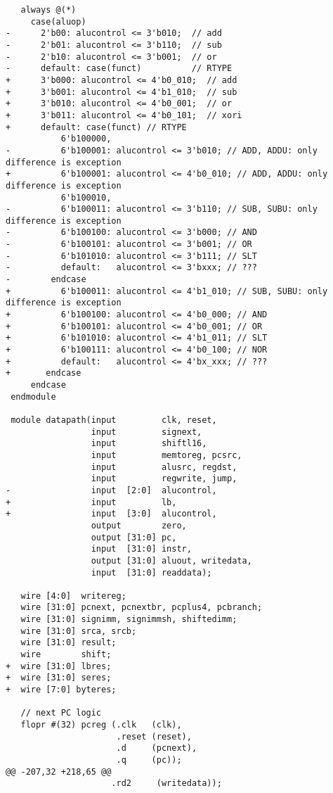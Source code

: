 \begin{verbatim}
   always @(*)
     case(aluop)
-      2'b00: alucontrol <= 3'b010;  // add
-      2'b01: alucontrol <= 3'b110;  // sub
-      2'b10: alucontrol <= 3'b001;  // or
-      default: case(funct)          // RTYPE
+      3'b000: alucontrol <= 4'b0_010;  // add
+      3'b001: alucontrol <= 4'b1_010;  // sub
+      3'b010: alucontrol <= 4'b0_001;  // or
+      3'b011: alucontrol <= 4'b0_101;  // xori
+      default: case(funct) // RTYPE
           6'b100000,
-          6'b100001: alucontrol <= 3'b010; // ADD, ADDU: only difference is exception
+          6'b100001: alucontrol <= 4'b0_010; // ADD, ADDU: only difference is exception
           6'b100010,
-          6'b100011: alucontrol <= 3'b110; // SUB, SUBU: only difference is exception
-          6'b100100: alucontrol <= 3'b000; // AND
-          6'b100101: alucontrol <= 3'b001; // OR
-          6'b101010: alucontrol <= 3'b111; // SLT
-          default:   alucontrol <= 3'bxxx; // ???
-        endcase
+          6'b100011: alucontrol <= 4'b1_010; // SUB, SUBU: only difference is exception
+          6'b100100: alucontrol <= 4'b0_000; // AND
+          6'b100101: alucontrol <= 4'b0_001; // OR
+          6'b101010: alucontrol <= 4'b1_011; // SLT
+          6'b100111: alucontrol <= 4'b0_100; // NOR
+          default:   alucontrol <= 4'bx_xxx; // ???
+       endcase
     endcase
 endmodule
 
 module datapath(input         clk, reset,
                 input         signext,
                 input         shiftl16,
                 input         memtoreg, pcsrc,
                 input         alusrc, regdst,
                 input         regwrite, jump,
-                input  [2:0]  alucontrol,
+                input         lb,
+                input  [3:0]  alucontrol,
                 output        zero,
                 output [31:0] pc,
                 input  [31:0] instr,
                 output [31:0] aluout, writedata,
                 input  [31:0] readdata);
 
   wire [4:0]  writereg;
   wire [31:0] pcnext, pcnextbr, pcplus4, pcbranch;
   wire [31:0] signimm, signimmsh, shiftedimm;
   wire [31:0] srca, srcb;
   wire [31:0] result;
   wire        shift;
+  wire [31:0] lbres;
+  wire [31:0] seres;
+  wire [7:0] byteres;
 
   // next PC logic
   flopr #(32) pcreg (.clk   (clk), 
                      .reset (reset), 
                      .d     (pcnext), 
                      .q     (pc));
@@ -207,32 +218,65 @@
                     .rd2     (writedata));
 

\end{verbatim}
